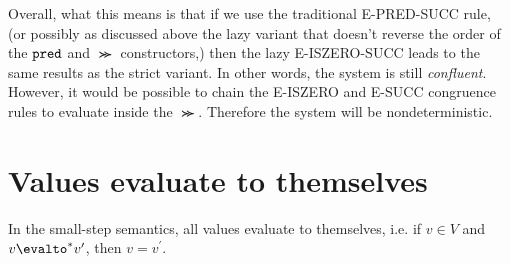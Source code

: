 \documentclass[11pt,letterpaper]{article}
\begin{document}
\begin{description}
        Overall, what this means is that if we use the traditional E-PRED-SUCC
        rule, (or possibly as discussed above the lazy variant that doesn't
        reverse the order of the $\operatorname{\mathtt{pred}}$ and $\Succ$ constructors,) then the
        lazy E-ISZERO-SUCC leads to the same results as the strict variant. In
        other words, the system is still \emph{confluent}. However, it would be
        possible to chain the E-ISZERO and E-SUCC congruence rules to evaluate
        inside the $\Succ$. Therefore the system will be nondeterministic.
\end{description}

\section{Values evaluate to themselves}

\begin{prop}
    In the small-step semantics, all values evaluate to themselves,
    i.e. if $v \in V$ and $v \evalto^* v^\prime$, then $v = v^\prime$.
\end{prop}
\end{document}
